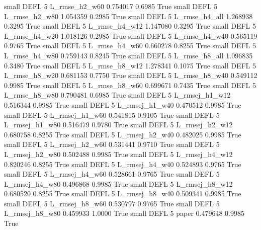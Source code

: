      small     DEFL                 5  L_rmse_h2_w60   0.754017      0.6985    True
     small     DEFL                 5  L_rmse_h2_w80   1.054359      0.2985    True
     small     DEFL                 5  L_rmse_h4_all   1.268938      0.3295    True
     small     DEFL                 5  L_rmse_h4_w12   1.147080      0.3295    True
     small     DEFL                 5  L_rmse_h4_w20   1.018126      0.2985    True
     small     DEFL                 5  L_rmse_h4_w40   0.565119      0.9765    True
     small     DEFL                 5  L_rmse_h4_w60   0.660278      0.8255    True
     small     DEFL                 5  L_rmse_h4_w80   0.759143      0.8245    True
     small     DEFL                 5  L_rmse_h8_all   1.096835      0.3480    True
     small     DEFL                 5  L_rmse_h8_w12   1.278341      0.1075    True
     small     DEFL                 5  L_rmse_h8_w20   0.681153      0.7750    True
     small     DEFL                 5  L_rmse_h8_w40   0.549112      0.9985    True
     small     DEFL                 5  L_rmse_h8_w60   0.699671      0.7435    True
     small     DEFL                 5  L_rmse_h8_w80   0.790481      0.6985    True
     small     DEFL                 5 L_rmsej_h1_w12   0.516344      0.9985    True
     small     DEFL                 5 L_rmsej_h1_w40   0.470512      0.9985    True
     small     DEFL                 5 L_rmsej_h1_w60   0.541815      0.9105    True
     small     DEFL                 5 L_rmsej_h1_w80   0.516479      0.9780    True
     small     DEFL                 5 L_rmsej_h2_w12   0.680758      0.8255    True
     small     DEFL                 5 L_rmsej_h2_w40   0.482025      0.9985    True
     small     DEFL                 5 L_rmsej_h2_w60   0.531441      0.9710    True
     small     DEFL                 5 L_rmsej_h2_w80   0.502488      0.9985    True
     small     DEFL                 5 L_rmsej_h4_w12   0.820246      0.8255    True
     small     DEFL                 5 L_rmsej_h4_w40   0.524893      0.9765    True
     small     DEFL                 5 L_rmsej_h4_w60   0.528661      0.9765    True
     small     DEFL                 5 L_rmsej_h4_w80   0.496868      0.9985    True
     small     DEFL                 5 L_rmsej_h8_w12   0.680520      0.8255    True
     small     DEFL                 5 L_rmsej_h8_w40   0.509341      0.9985    True
     small     DEFL                 5 L_rmsej_h8_w60   0.530797      0.9765    True
     small     DEFL                 5 L_rmsej_h8_w80   0.459933      1.0000    True
     small     DEFL                 5          paper   0.479648      0.9985    True
